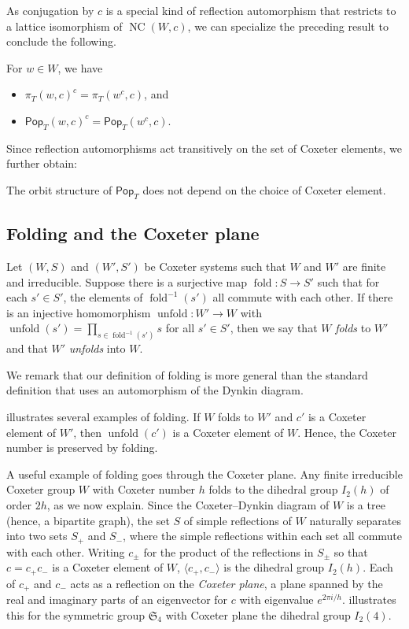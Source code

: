 \documentclass[ALCO,ThmDefs,Unicode,epreuves]{cedram}
\newcommand{\darkblue}{\color{darkblue}}
\newcommand{\defn}[1]{\emph{\darkblue #1}}
\newcommand{\pop}{\mathsf{Pop}}
\newcommand{\U}{{W'}}
\DeclareMathOperator{\NC}{NC}
\DeclareMathOperator{\fold}{fold}
\DeclareMathOperator{\unfold}{unfold}
\begin{document}
As conjugation by $c$ is a special kind of reflection automorphism that restricts to a lattice isomorphism of $\NC(W,c)$, we can specialize the preceding result to conclude the following.

\begin{coro} For $w \in W$, we have
\begin{itemize}
    \item  $\pi_T(w,c)^c = \pi_T(w^c,c)$, and
    \item $\pop_T(w,c)^c = \pop_T(w^c,c)$. 
\end{itemize}
\end{coro}


Since reflection automorphisms act transitively on the set of Coxeter elements, we further obtain:
\begin{coro}
\label{cor:orbit_structure}
The orbit structure of $\pop_T$ does not depend on the choice of Coxeter element.
\end{coro}

\subsection{Folding and the Coxeter plane}
\label{sec:folding}

 


\begin{defi}
Let $(W,S)$ and $(\U,S')$ be Coxeter systems such that $W$ and $W'$ are finite and irreducible. Suppose there is a surjective map $\fold:S\to S'$ such that for each $s'\in S'$, the elements of $\fold^{-1}(s')$ all commute with each other. If there is an injective homomorphism $\unfold:\U\to W$ with $\unfold(s')=\prod_{s\in\fold^{-1}(s')}s$ for all $s'\in S'$, then we say that $W$ \defn{folds} to $W'$ and that $W'$ \defn{unfolds} into $W$. 
\end{defi}

We remark that our definition of folding is more general than the standard definition that uses an automorphism of the Dynkin diagram. 

 illustrates several examples of folding. If $W$ folds to $\U$ and $c'$ is a Coxeter element of $\U$, then $\unfold(c')$ is a Coxeter element of $W$. Hence, the Coxeter number is preserved by folding.

A useful example of folding goes through the Coxeter plane.  Any finite irreducible Coxeter group $W$ with Coxeter number $h$ folds to the dihedral group $I_2(h)$ of order $2h$, as we now explain.  Since the Coxeter--Dynkin diagram of $W$ is a tree (hence, a bipartite graph), the set $S$ of simple reflections of $W$ naturally separates into two sets $S_+$ and $S_-$, where the simple reflections within each set all commute with each other.  Writing $c_\pm$ for the product of the reflections in $S_\pm$ so that $c = c_+ c_-$ is a Coxeter element of $W$, $\langle c_+,c_-\rangle$ is the dihedral group $I_2(h)$.  Each of $c_+$ and $c_-$ acts as a reflection on the \defn{Coxeter plane}, a plane spanned by the real and imaginary parts of an eigenvector for $c$ with eigenvalue $e^{2\pi i/h}$.   illustrates this for the symmetric group $\mathfrak{S}_4$ with Coxeter plane the dihedral group $I_2(4)$.
\end{document}
